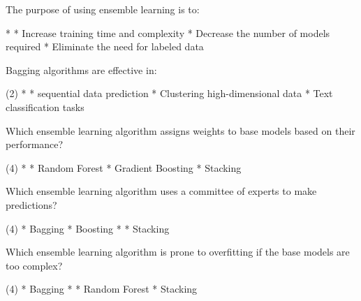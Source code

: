 \documentclass[11pt]{extarticle}
\begin{document}
\begin{exercise}
    The purpose of using ensemble learning is to:
    \begin{choice}
        * 
        * Increase training time and complexity
        * Decrease the number of models required
        * Eliminate the need for labeled data
    \end{choice}
\end{exercise}
\begin{solution}
\end{solution}

\begin{exercise}
    Bagging algorithms are effective in:
    \begin{choice}(2)
        * 
        * sequential data prediction
        * Clustering high-dimensional data
        * Text classification tasks
    \end{choice}
\end{exercise}
\begin{solution}
\end{solution}

\begin{exercise}
    Which ensemble learning algorithm assigns weights to base models based on their performance?
    \begin{choice} (4)
        * 
        * Random Forest
        * Gradient Boosting
        * Stacking
    \end{choice}
\end{exercise}
\begin{solution}
\end{solution}

\begin{exercise}
    Which ensemble learning algorithm uses a committee of experts to make predictions?
    \begin{choice} (4)
        * Bagging
        * Boosting
        * 
        * Stacking
    \end{choice}
\end{exercise}
\begin{solution}
\end{solution}

\begin{exercise}
    Which ensemble learning algorithm is prone to overfitting if the base models are too complex?
    \begin{choice} (4)
        * Bagging
        * 
        * Random Forest
        * Stacking
    \end{choice}
\end{exercise}
\begin{solution}
\end{solution}
\end{document}
